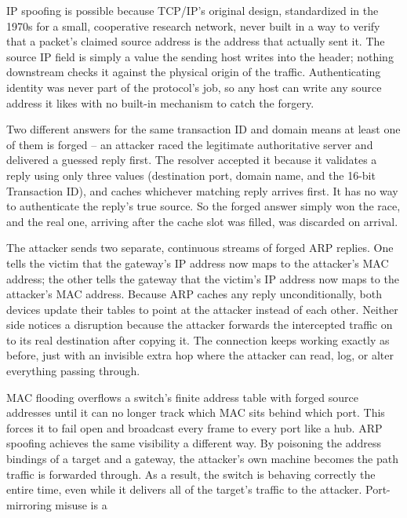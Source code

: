 \begin{answerkey}
\item IP spoofing is possible because TCP/IP's original design, standardized in the 1970s for a
small, cooperative research network, never built in a way to verify that a packet's claimed source
address is the address that actually sent it. The source IP field is simply a value the sending
host writes into the header; nothing downstream checks it against the physical origin of the
traffic. Authenticating identity was never part of the protocol's job, so any host can write any
source address it likes with no built-in mechanism to catch the forgery.
\item Two different answers for the same transaction ID and domain means at least one of them is
forged -- an attacker raced the legitimate authoritative server and delivered a guessed reply first.
The resolver accepted it because it validates a reply using only three values (destination port,
domain name, and the 16-bit Transaction ID), and caches whichever matching reply arrives first. It
has no way to authenticate the reply's true source. So the forged answer simply won the race, and
the real one, arriving after the cache slot was filled, was discarded on arrival.
\item The attacker sends two separate, continuous streams of forged ARP replies. One tells the
victim that the gateway's IP address now maps to the attacker's MAC address; the other tells the
gateway that the victim's IP address now maps to the attacker's MAC address. Because ARP caches any
reply unconditionally, both devices update their tables to point at the attacker instead of each
other. Neither side notices a disruption because the attacker forwards the intercepted traffic on
to its real destination after copying it. The connection keeps working exactly as before, just
with an invisible extra hop where the attacker can read, log, or alter everything passing through.
\item MAC flooding overflows a switch's finite address table with forged source addresses until it
can no longer track which MAC sits behind which port. This forces it to fail open and broadcast
every frame to every port like a hub. ARP spoofing achieves the same visibility a different way.
By poisoning the address bindings of a target and a gateway, the attacker's own machine becomes the
path traffic is forwarded through. As a result, the switch is behaving correctly the entire time,
even while it delivers all of the target's traffic to the attacker. Port-mirroring misuse is a

\end{answerkey}
